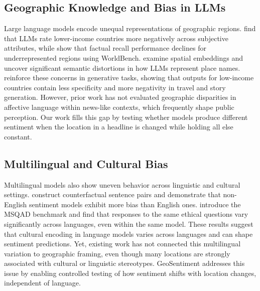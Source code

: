 \documentclass{article} %
\begin{document}
\subsection{Geographic Knowledge and Bias in LLMs}
Large language models encode unequal representations of geographic regions. \citet{manvi2024geographically} find that LLMs rate lower-income countries more negatively across subjective attributes, while \citet{moayeri2024worldbench} show that factual recall performance declines for underrepresented regions using WorldBench. \citet{decoupes2024distortions} examine spatial embeddings and uncover significant semantic distortions in how LLMs represent place names. \citet{bhagat2025richer} reinforce these concerns in generative tasks, showing that outputs for low-income countries contain less specificity and more negativity in travel and story generation. However, prior work has not evaluated geographic disparities in affective language within news-like contexts, which frequently shape public perception. Our work fills this gap by testing whether models produce different sentiment when the location in a headline is changed while holding all else constant.

\subsection{Multilingual and Cultural Bias}
Multilingual models also show uneven behavior across linguistic and cultural settings. \citet{goldfarb2023bias} construct counterfactual sentence pairs and demonstrate that non-English sentiment models exhibit more bias than English ones. \citet{yu2025msqad} introduce the MSQAD benchmark and find that responses to the same ethical questions vary significantly across languages, even within the same model. These results suggest that cultural encoding in language models varies across languages and can shape sentiment predictions. Yet, existing work has not connected this multilingual variation to geographic framing, even though many locations are strongly associated with cultural or linguistic stereotypes. GeoSentiment addresses this issue by enabling controlled testing of how sentiment shifts with location changes, independent of language.
\end{document}
